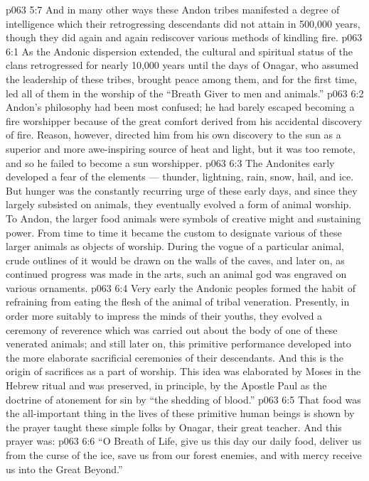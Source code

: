 \vs p063 5:7 And in many other ways these Andon tribes manifested a degree of intelligence which their retrogressing descendants did not attain in 500,000 years, though they did again and again rediscover various methods of kindling fire.
\vs p063 6:1 As the Andonic dispersion extended, the cultural and spiritual status of the clans retrogressed for nearly 10,000 years until the days of Onagar, who assumed the leadership of these tribes, brought peace among them, and for the first time, led all of them in the worship of the “Breath Giver to men and animals.”
\vs p063 6:2 \pc Andon’s philosophy had been most confused; he had barely escaped becoming a fire worshipper because of the great comfort derived from his accidental discovery of fire. Reason, however, directed him from his own discovery to the sun as a superior and more awe\hyp{}inspiring source of heat and light, but it was too remote, and so he failed to become a sun worshipper.
\vs p063 6:3 The Andonites early developed a fear of the elements --- thunder, lightning, rain, snow, hail, and ice. But hunger was the constantly recurring urge of these early days, and since they largely subsisted on animals, they eventually evolved a form of animal worship. To Andon, the larger food animals were symbols of creative might and sustaining power. From time to time it became the custom to designate various of these larger animals as objects of worship. During the vogue of a particular animal, crude outlines of it would be drawn on the walls of the caves, and later on, as continued progress was made in the arts, such an animal god was engraved on various ornaments.
\vs p063 6:4 Very early the Andonic peoples formed the habit of refraining from eating the flesh of the animal of tribal veneration. Presently, in order more suitably to impress the minds of their youths, they evolved a ceremony of reverence which was carried out about the body of one of these venerated animals; and still later on, this primitive performance developed into the more elaborate sacrificial ceremonies of their descendants. And this is the origin of sacrifices as a part of worship. This idea was elaborated by Moses in the Hebrew ritual and was preserved, in principle, by the Apostle Paul as the doctrine of atonement for sin by “the shedding of blood.”
\vs p063 6:5 That food was the all\hyp{}important thing in the lives of these primitive human beings is shown by the prayer taught these simple folks by Onagar, their great teacher. And this prayer was:
\vs p063 6:6 “O Breath of Life, give us this day our daily food, deliver us from the curse of the ice, save us from our forest enemies, and with mercy receive us into the Great Beyond.”
